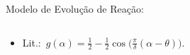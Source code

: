 \begin{frame}{Modelo de Evolução de Reação:}
\begin{columns}
\begin{itemize}
\begin{itemize}
                    \\[\smallskipamount]
                \item<7-> Lit.:~\alert{$g(\alpha) = \frac{1}{2}-\frac{1}{2} \cos \bigl(
                    \frac{\pi}{\delta} (\alpha - \theta) \bigr)$}.
            \end{itemize}
        \end{itemize}
        \begin{center}
        \end{center}
        \end{columns}
    \end{frame}

